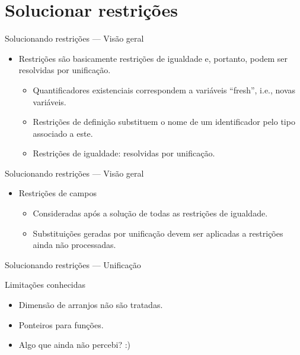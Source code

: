 \documentclass{beamer}
\begin{document}
   \section{Solucionar restrições }
   \begin{frame}{Solucionando restrições --- Visão geral}
       \begin{itemize}
           \item Restrições são basicamente restrições de igualdade e,
             portanto, podem ser resolvidas por unificação.
             \begin{itemize}
                  \item Quantificadores existenciais correspondem a
                    variáveis ``fresh'', i.e., novas variáveis.
                  \item Restrições de definição substituem o nome de
                    um identificador pelo tipo associado a este.
                  \item Restrições de igualdade: resolvidas por unificação.
             \end{itemize}
       \end{itemize}
   \end{frame}
   \begin{frame}{Solucionando restrições --- Visão geral}
      \begin{itemize}
           \item Restrições de campos
           \begin{itemize}
                \item Consideradas após a solução de todas as
                  restrições de igualdade.
                \item Substituições geradas por unificação devem ser
                  aplicadas a restrições ainda não processadas.
           \end{itemize}       
      \end{itemize}
   \end{frame}
   \begin{frame}{Solucionando restrições --- Unificação}
   \end{frame}
   \begin{frame}{Limitações conhecidas}
     \begin{itemize}
          \item Dimensão de arranjos não são tratadas.
          \item Ponteiros para funções.
          \item Algo que ainda não percebi? :)
     \end{itemize}
   \end{frame}
\end{document}
